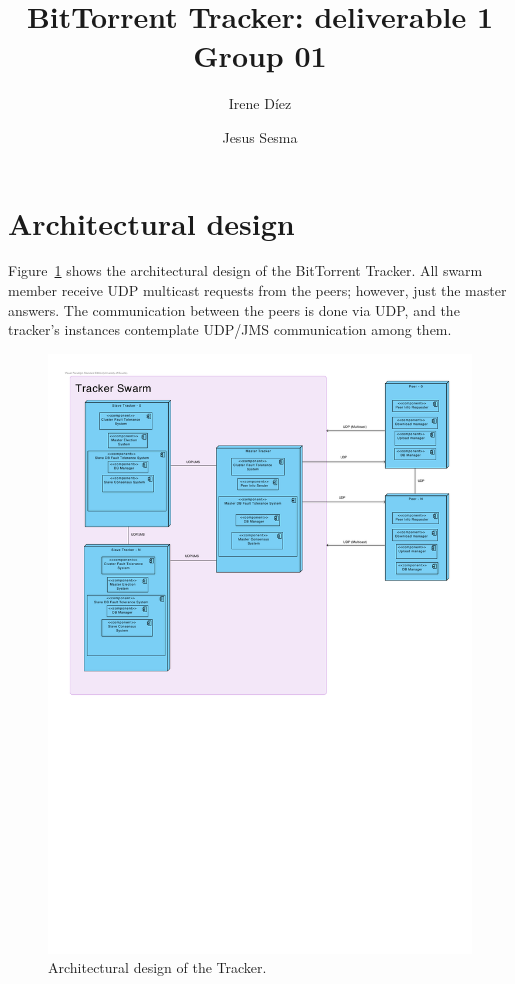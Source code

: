 \documentclass[twoside,a4paper,10pt]{article}
\title{BitTorrent Tracker: deliverable 1\\
   Group 01}
\author{Irene Díez \and Jesus Sesma}
\begin{document}
\date{}
\maketitle


\section{Architectural design}

Figure~\ref{fig:arch} shows the architectural design of the BitTorrent Tracker.
All swarm member receive UDP multicast requests from the peers; however, just
the master answers.
The communication between the peers is done via UDP, and the
tracker's instances contemplate UDP/JMS communication among them.

\begin{figure}[h]
  \centering
  \includegraphics[width=\textwidth]{vp/architectural-design.pdf}
  \caption{\label{fig:arch}Architectural design of the Tracker.}
\end{figure}
\end{document}
